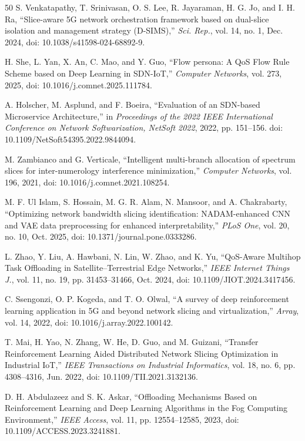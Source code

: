 \documentclass[conference]{IEEEtran}
\begin{document}
\begin{thebibliography}{50}
 S. Venkatapathy, T. Srinivasan, O. S. Lee, R. Jayaraman, H. G. Jo, and I. H. Ra, ``Slice-aware 5G network orchestration framework based on dual-slice isolation and management strategy (D-SIMS),'' \emph{Sci. Rep.}, vol. 14, no. 1, Dec. 2024, doi: 10.1038/s41598-024-68892-9.

 H. She, L. Yan, X. An, C. Mao, and Y. Guo, ``Flow persona: A QoS Flow Rule Scheme based on Deep Learning in SDN-IoT,'' \emph{Computer Networks}, vol. 273, 2025, doi: 10.1016/j.comnet.2025.111784.

 A. Holscher, M. Asplund, and F. Boeira, ``Evaluation of an SDN-based Microservice Architecture,'' in \emph{Proceedings of the 2022 IEEE International Conference on Network Softwarization, NetSoft 2022}, 2022, pp. 151--156. doi: 10.1109/NetSoft54395.2022.9844094.

 M. Zambianco and G. Verticale, ``Intelligent multi-branch allocation of spectrum slices for inter-numerology interference minimization,'' \emph{Computer Networks}, vol. 196, 2021, doi: 10.1016/j.comnet.2021.108254.

 M. F. Ul Islam, S. Hossain, M. G. R. Alam, N. Mansoor, and A. Chakrabarty, ``Optimizing network bandwidth slicing identification: NADAM-enhanced CNN and VAE data preprocessing for enhanced interpretability,'' \emph{PLoS One}, vol. 20, no. 10, Oct. 2025, doi: 10.1371/journal.pone.0333286.

 L. Zhao, Y. Liu, A. Hawbani, N. Lin, W. Zhao, and K. Yu, ``QoS-Aware Multihop Task Offloading in Satellite--Terrestrial Edge Networks,'' \emph{IEEE Internet Things J.}, vol. 11, no. 19, pp. 31453--31466, Oct. 2024, doi: 10.1109/JIOT.2024.3417456.

 C. Ssengonzi, O. P. Kogeda, and T. O. Olwal, ``A survey of deep reinforcement learning application in 5G and beyond network slicing and virtualization,'' \emph{Array}, vol. 14, 2022, doi: 10.1016/j.array.2022.100142.

 T. Mai, H. Yao, N. Zhang, W. He, D. Guo, and M. Guizani, ``Transfer Reinforcement Learning Aided Distributed Network Slicing Optimization in Industrial IoT,'' \emph{IEEE Transactions on Industrial Informatics}, vol. 18, no. 6, pp. 4308--4316, Jun. 2022, doi: 10.1109/TII.2021.3132136.

 D. H. Abdulazeez and S. K. Askar, ``Offloading Mechanisms Based on Reinforcement Learning and Deep Learning Algorithms in the Fog Computing Environment,'' \emph{IEEE Access}, vol. 11, pp. 12554--12585, 2023, doi: 10.1109/ACCESS.2023.3241881.


\end{thebibliography}
\end{document}

